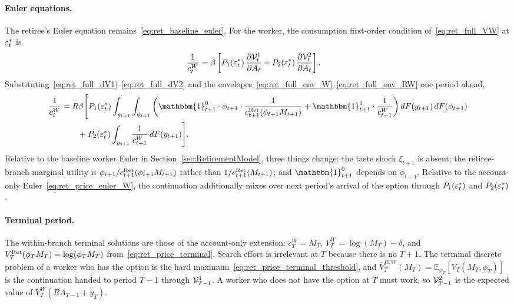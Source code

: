 \paragraph{Euler equations.}
The retiree's Euler equation remains~\eqref{eq:ret_baseline_euler}. For the worker, the consumption first-order condition of~\eqref{eq:ret_full_VW} at $\varepsilon_t^{\ast}$ is
\begin{align}
	\frac{1}{c_t^{W}}
	&= \beta\left[
		P_1(\varepsilon_t^{\ast})\,\frac{\partial\mathcal{V}_t^{1}}{\partial A_t}
		+P_2(\varepsilon_t^{\ast})\,\frac{\partial\mathcal{V}_t^{2}}{\partial A_t}
	\right].
	\label{eq:ret_full_foc_c}
\end{align}
Substituting~\eqref{eq:ret_full_dV1}--\eqref{eq:ret_full_dV2} and the envelopes~\eqref{eq:ret_full_env_W}--\eqref{eq:ret_full_env_RW} one period ahead,
\begin{equation}
\begin{aligned}
	\frac{1}{c_t^{W}}
	&= R\beta\Bigg[
		P_1(\eff_t^{\ast})
		\int_{y_{t+1}}\int_{\phi_{t+1}}
		\left(
			\mathbbm{1}_{t+1}^{0}\cdot\phi_{t+1}\cdot\frac{1}{c_{t+1}^{\Ret}(\phi_{t+1} M_{t+1})}
			+\mathbbm{1}_{t+1}^{1}\cdot\frac{1}{c_{t+1}^{W}}
		\right)
		dF(y_{t+1})\,dF(\phi_{t+1})
		\\
		&\qquad
		+P_2(\eff_t^{\ast})
		\int_{y_{t+1}}
		\frac{1}{c_{t+1}^{W}}
		\,dF(y_{t+1})
	\Bigg].
	\label{eq:ret_full_euler_W}
\end{aligned}
\end{equation}
Relative to the baseline worker Euler in Section~\ref{sec:RetirementModel}, three things change: the taste shock $\xi_{t+1}$ is absent; the retiree-branch marginal utility is $\phi_{t+1}/c_{t+1}^{\mathrm{Ret}}(\phi_{t+1} M_{t+1})$ rather than $1/c_{t+1}^{\mathrm{Ret}}(M_{t+1})$; and $\mathbbm{1}_{t+1}^{0}$ depends on $\phi_{t+1}$. Relative to the account-only Euler~\eqref{eq:ret_price_euler_W}, the continuation additionally mixes over next period's arrival of the option through $P_1(\varepsilon_t^{\ast})$ and $P_2(\varepsilon_t^{\ast})$.

\paragraph{Terminal period.}
The within-branch terminal solutions are those of the account-only extension: $c_T^{W}=M_T$, $V_T^{W}=\log(M_T)-\delta$, and $V_T^{\mathrm{Ret}}(\phi_T M_T)=\log(\phi_T M_T)$ from~\eqref{eq:ret_price_terminal}. Search effort is irrelevant at $T$ because there is no $T+1$. The terminal discrete problem of a worker who has the option is the hard maximum~\eqref{eq:ret_price_terminal_threshold}, and $\bar V_T^{R,W}(M_T)=\mathbb{E}_{\phi_T}[V_T(M_T,\phi_T)]$ is the continuation handed to period $T-1$ through $\mathcal{V}_{T-1}^{1}$. A worker who does not have the option at $T$ must work, so $\mathcal{V}_{T-1}^{2}$ is the expected value of $V_T^{W}(R A_{T-1}+y_T)$.

